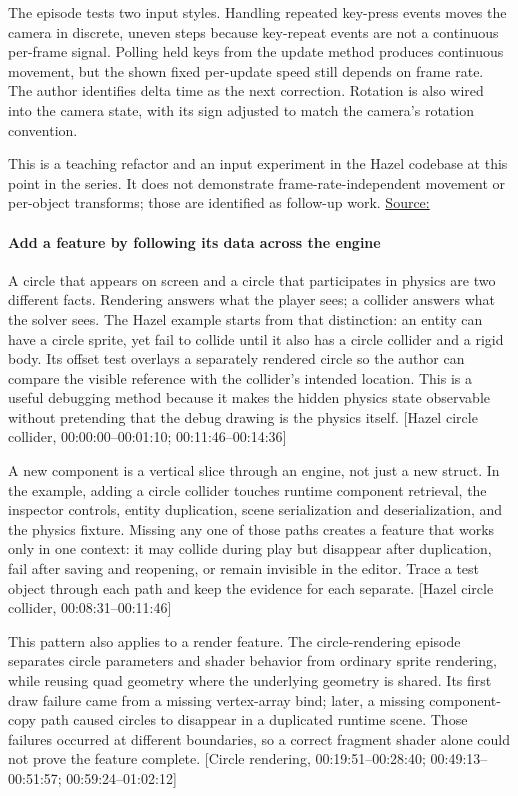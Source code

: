 The episode tests two input styles. Handling repeated key-press events moves the camera in discrete, uneven steps because key-repeat events are not a continuous per-frame signal. Polling held keys from the update method produces continuous movement, but the shown fixed per-update speed still depends on frame rate. The author identifies delta time as the next correction. Rotation is also wired into the camera state, with its sign adjusted to match the camera's rotation convention.

This is a teaching refactor and an input experiment in the Hazel codebase at this point in the series. It does not demonstrate frame-rate-independent movement or per-object transforms; those are identified as follow-up work. \href{https://www.youtube.com/watch?v=4zj-0FQ7Xbg}{Source:}

\paragraph{Add a feature by following its data across the engine}\label{add-a-feature-by-following-its-data-across-the-engine}

A circle that appears on screen and a circle that participates in physics are two different facts. Rendering answers what the player sees; a collider answers what the solver sees. The Hazel example starts from that distinction: an entity can have a circle sprite, yet fail to collide until it also has a circle collider and a rigid body. Its offset test overlays a separately rendered circle so the author can compare the visible reference with the collider's intended location. This is a useful debugging method because it makes the hidden physics state observable without pretending that the debug drawing is the physics itself. {[}Hazel circle collider, 00:00:00--00:01:10; 00:11:46--00:14:36{]}

A new component is a vertical slice through an engine, not just a new struct. In the example, adding a circle collider touches runtime component retrieval, the inspector controls, entity duplication, scene serialization and deserialization, and the physics fixture. Missing any one of those paths creates a feature that works only in one context: it may collide during play but disappear after duplication, fail after saving and reopening, or remain invisible in the editor. Trace a test object through each path and keep the evidence for each separate. {[}Hazel circle collider, 00:08:31--00:11:46{]}

This pattern also applies to a render feature. The circle-rendering episode separates circle parameters and shader behavior from ordinary sprite rendering, while reusing quad geometry where the underlying geometry is shared. Its first draw failure came from a missing vertex-array bind; later, a missing component-copy path caused circles to disappear in a duplicated runtime scene. Those failures occurred at different boundaries, so a correct fragment shader alone could not prove the feature complete. {[}Circle rendering, 00:19:51--00:28:40; 00:49:13--00:51:57; 00:59:24--01:02:12{]}

